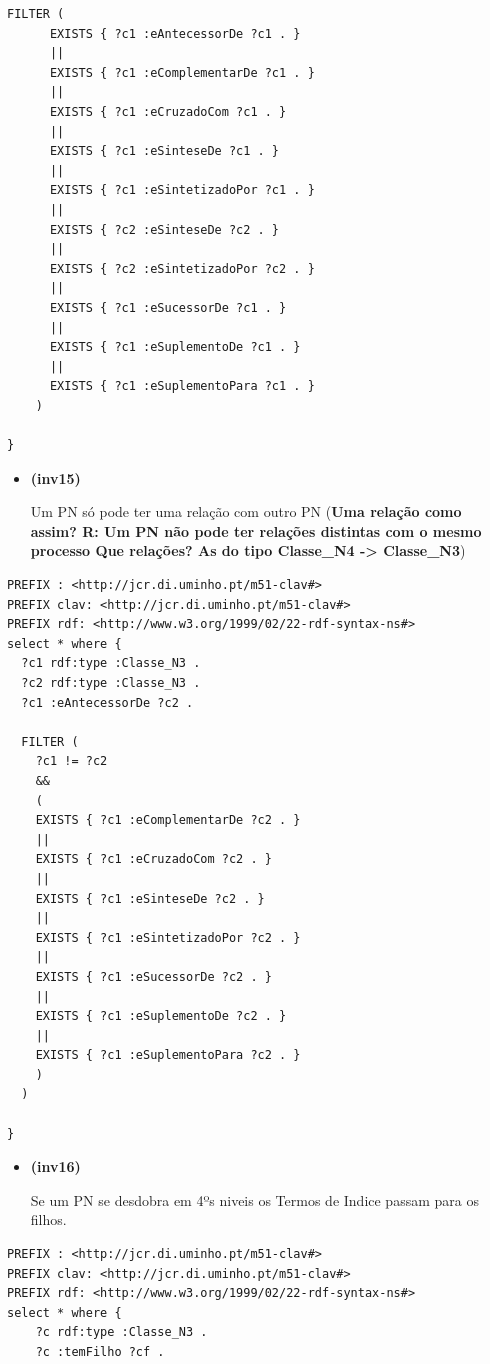 \documentclass[tikz,runningheads,a4paper]{llncs}
\begin{document}
\begin{subappendices}
\begin{lstlisting}[language=sparql, frame=single, basicstyle=\scriptsize]
    FILTER (
      EXISTS { ?c1 :eAntecessorDe ?c1 . }
      ||
      EXISTS { ?c1 :eComplementarDe ?c1 . }
      ||
      EXISTS { ?c1 :eCruzadoCom ?c1 . }
      ||
      EXISTS { ?c1 :eSinteseDe ?c1 . }
      ||
      EXISTS { ?c1 :eSintetizadoPor ?c1 . }
      ||
      EXISTS { ?c2 :eSinteseDe ?c2 . }
      ||
      EXISTS { ?c2 :eSintetizadoPor ?c2 . }
      ||
      EXISTS { ?c1 :eSucessorDe ?c1 . }
      ||
      EXISTS { ?c1 :eSuplementoDe ?c1 . }
      ||
      EXISTS { ?c1 :eSuplementoPara ?c1 . }
    )

}
\end{lstlisting}

\begin{itemize}
\tightlist
\item
  \hypertarget{inv15}{\textbf{(inv15)}} Um PN só pode ter uma relação com outro PN
  (\textbf{Uma relação como assim? R: Um PN não pode ter relações
  distintas com o mesmo processo \textbar{} Que relações? As do tipo
  Classe\_N4 -\textgreater{} Classe\_N3})
\end{itemize}

\begin{lstlisting}[language=sparql, frame=single, basicstyle=\scriptsize]
PREFIX : <http://jcr.di.uminho.pt/m51-clav#>
PREFIX clav: <http://jcr.di.uminho.pt/m51-clav#>
PREFIX rdf: <http://www.w3.org/1999/02/22-rdf-syntax-ns#>
select * where { 
  ?c1 rdf:type :Classe_N3 .
  ?c2 rdf:type :Classe_N3 .
  ?c1 :eAntecessorDe ?c2 .

  FILTER (
    ?c1 != ?c2
    &&
    (
    EXISTS { ?c1 :eComplementarDe ?c2 . }
    ||
    EXISTS { ?c1 :eCruzadoCom ?c2 . }
    ||
    EXISTS { ?c1 :eSinteseDe ?c2 . }
    ||
    EXISTS { ?c1 :eSintetizadoPor ?c2 . }
    ||
    EXISTS { ?c1 :eSucessorDe ?c2 . }
    ||
    EXISTS { ?c1 :eSuplementoDe ?c2 . }
    ||
    EXISTS { ?c1 :eSuplementoPara ?c2 . }
    )
  )

}
\end{lstlisting}

\begin{itemize}
\tightlist
\item
  \hypertarget{inv16}{\textbf{(inv16)}} Se um PN se desdobra em 4ºs niveis os Termos de
  Indice passam para os filhos.
\end{itemize}

\begin{lstlisting}[language=sparql, frame=single, basicstyle=\scriptsize]
PREFIX : <http://jcr.di.uminho.pt/m51-clav#>
PREFIX clav: <http://jcr.di.uminho.pt/m51-clav#>
PREFIX rdf: <http://www.w3.org/1999/02/22-rdf-syntax-ns#>
select * where { 
    ?c rdf:type :Classe_N3 .
    ?c :temFilho ?cf .



\end{lstlisting}
\end{subappendices}
\end{document}
